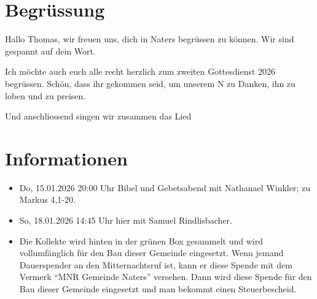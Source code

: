 \documentclass[fontsize=14pt]{../../inc/mybib}
\newcommand{\Name}{Thomas}
\begin{document}
\section{Begrüssung}
Hallo \Name{}, wir freuen uns, dich in Naters begrüssen zu können. Wir sind gespannt auf dein Wort.

Ich möchte auch euch alle recht herzlich zum zweiten Gottesdienst 2026 begrüssen. Schön, dass ihr gekommen seid, um unserem \herr N zu Danken, ihn zu loben und zu preisen.

\beten{} Und anschliessend singen wir zusammen das Lied



\section{Informationen}
\begin{itemize}
    \item {} Do, 15.01.2026 20:00 Uhr Bibel und Gebetsabend mit Nathanael Winkler; zu Markus 4,1-20.
    \item {} So, 18.01.2026 14:45 Uhr hier mit Samuel Rindlisbacher. 
    \item {} Die Kollekte wird hinten in der grünen Box gesammelt und wird vollumfänglich für den Bau dieser Gemeinde eingesetzt.\newline
    Wenn jemand Dauerspender an den Mitternachtsruf ist, kann er diese Spende mit dem Vermerk \enquote{MNR Gemeinde Naters} versehen. Dann wird diese Spende für den Bau dieser Gemeinde eingesetzt und man bekommt einen Steuerbescheid.    
\end{itemize}
\end{document}
